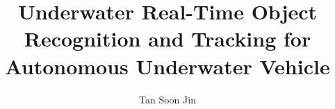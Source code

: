 \documentclass[fypca]{socreport}
\begin{document}
\title{Underwater Real-Time Object Recognition and Tracking for Autonomous Underwater Vehicle}
\author{Tan Soon Jin}

\maketitle



\listoffigures
\listoftables










{}

\end{document}
